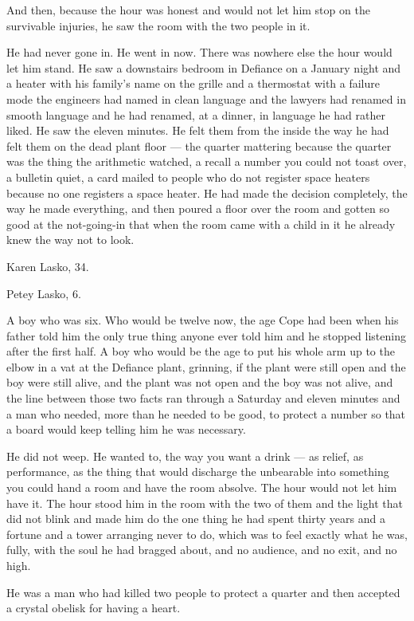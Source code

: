 \documentclass[11pt,openany]{book}
\begin{document}
And then, because the hour was honest and would not let him stop on the survivable injuries, he saw the room with the two people in it.

He had never gone in. He went in now. There was nowhere else the hour would let him stand. He saw a downstairs bedroom in Defiance on a January night and a heater with his family's name on the grille and a thermostat with a failure mode the engineers had named in clean language and the lawyers had renamed in smooth language and he had renamed, at a dinner, in language he had rather liked. He saw the eleven minutes. He felt them from the inside the way he had felt them on the dead plant floor --- the quarter mattering because the quarter was the thing the arithmetic watched, a recall a number you could not toast over, a bulletin quiet, a card mailed to people who do not register space heaters because no one registers a space heater. He had made the decision completely, the way he made everything, and then poured a floor over the room and gotten so good at the not-going-in that when the room came with a child in it he already knew the way not to look.

Karen Lasko, 34.

Petey Lasko, 6.

A boy who was six. Who would be twelve now, the age Cope had been when his father told him the only true thing anyone ever told him and he stopped listening after the first half. A boy who would be the age to put his whole arm up to the elbow in a vat at the Defiance plant, grinning, if the plant were still open and the boy were still alive, and the plant was not open and the boy was not alive, and the line between those two facts ran through a Saturday and eleven minutes and a man who needed, more than he needed to be good, to protect a number so that a board would keep telling him he was necessary.

He did not weep. He wanted to, the way you want a drink --- as relief, as performance, as the thing that would discharge the unbearable into something you could hand a room and have the room absolve. The hour would not let him have it. The hour stood him in the room with the two of them and the light that did not blink and made him do the one thing he had spent thirty years and a fortune and a tower arranging never to do, which was to feel exactly what he was, fully, with the soul he had bragged about, and no audience, and no exit, and no high.

He was a man who had killed two people to protect a quarter and then accepted a crystal obelisk for having a heart.
\end{document}

